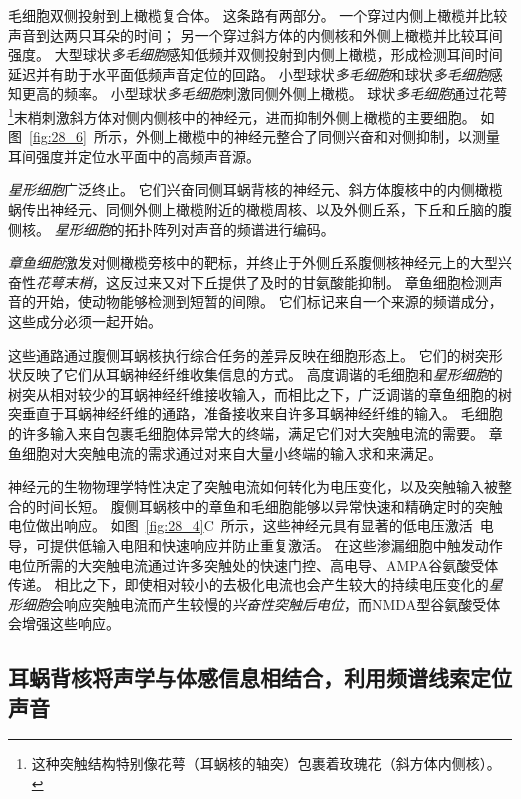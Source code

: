 毛细胞双侧投射到上橄榄复合体。
这条路有两部分。
一个穿过内侧上橄榄并比较声音到达两只耳朵的时间；
另一个穿过斜方体的内侧核和外侧上橄榄并比较耳间强度。
大型球状\textit{多毛细胞}感知低频并双侧投射到内侧上橄榄，形成检测耳间时间延迟并有助于水平面低频声音定位的回路。
小型球状\textit{多毛细胞}和球状\textit{多毛细胞}感知更高的频率。
小型球状\textit{多毛细胞}刺激同侧外侧上橄榄。
球状\textit{多毛细胞}通过花萼\footnote{这种突触结构特别像花萼（耳蜗核的轴突）包裹着玫瑰花（斜方体内侧核）。}末梢刺激斜方体对侧内侧核中的神经元，进而抑制外侧上橄榄的主要细胞。
如图~\ref{fig:28_6}~所示，外侧上橄榄中的神经元整合了同侧兴奋和对侧抑制，以测量耳间强度并定位水平面中的高频声音源。


\textit{星形细胞}广泛终止。
它们兴奋同侧耳蜗背核的神经元、斜方体腹核中的内侧橄榄蜗传出神经元、同侧外侧上橄榄附近的橄榄周核、以及外侧丘系，下丘和丘脑的腹侧核。
\textit{星形细胞}的拓扑阵列对声音的频谱进行编码。


\textit{章鱼细胞}激发对侧橄榄旁核中的靶标，并终止于外侧丘系腹侧核神经元上的大型兴奋性\textit{花萼末梢}，这反过来又对下丘提供了及时的甘氨酸能抑制。
章鱼细胞检测声音的开始，使动物能够检测到短暂的间隙。
它们标记来自一个来源的频谱成分，这些成分必须一起开始。


这些通路通过腹侧耳蜗核执行综合任务的差异反映在细胞形态上。
它们的树突形状反映了它们从耳蜗神经纤维收集信息的方式。
高度调谐的毛细胞和\textit{星形细胞}的树突从相对较少的耳蜗神经纤维接收输入，而相比之下，广泛调谐的章鱼细胞的树突垂直于耳蜗神经纤维的通路，准备接收来自许多耳蜗神经纤维的输入。
毛细胞的许多输入来自包裹毛细胞体异常大的终端，满足它们对大突触电流的需要。
章鱼细胞对大突触电流的需求通过对来自大量小终端的输入求和来满足。


神经元的生物物理学特性决定了突触电流如何转化为电压变化，以及突触输入被整合的时间长短。
腹侧耳蜗核中的章鱼和毛细胞能够以异常快速和精确定时的突触电位做出响应。
如图~\ref{fig:28_4}C~所示，这些神经元具有显著的低电压激活~电导，可提供低输入电阻和快速响应并防止重复激活。
在这些渗漏细胞中触发动作电位所需的大突触电流通过许多突触处的快速门控、高电导、AMPA谷氨酸受体传递。
相比之下，即使相对较小的去极化电流也会产生较大的持续电压变化的\textit{星形细胞}会响应突触电流而产生较慢的\textit{兴奋性突触后电位}，而NMDA型谷氨酸受体会增强这些响应。



\subsection{耳蜗背核将声学与体感信息相结合，利用频谱线索定位声音}

